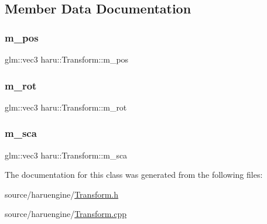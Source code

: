 \subsection{Member Data Documentation}
\mbox{\label{classharu_1_1_transform_a35eaba7475c13b6ad5925d112e4970ac}} 
\subsubsection{\texorpdfstring{m\+\_\+pos}{m\_pos}}
{\footnotesize\ttfamily glm\+::vec3 haru\+::\+Transform\+::m\+\_\+pos\hspace{0.3cm}{\ttfamily [private]}}

\mbox{\label{classharu_1_1_transform_af4ed94d05315ca5235e8a7ee7dd11990}} 
\subsubsection{\texorpdfstring{m\+\_\+rot}{m\_rot}}
{\footnotesize\ttfamily glm\+::vec3 haru\+::\+Transform\+::m\+\_\+rot\hspace{0.3cm}{\ttfamily [private]}}

\mbox{\label{classharu_1_1_transform_a1bba1e129d40a560ac0615b8e2de0d6e}} 
\subsubsection{\texorpdfstring{m\+\_\+sca}{m\_sca}}
{\footnotesize\ttfamily glm\+::vec3 haru\+::\+Transform\+::m\+\_\+sca\hspace{0.3cm}{\ttfamily [private]}}



The documentation for this class was generated from the following files\+:\begin{DoxyCompactItemize}
\item 
source/haruengine/\mbox{\hyperlink{_transform_8h}{Transform.\+h}}\item 
source/haruengine/\mbox{\hyperlink{_transform_8cpp}{Transform.\+cpp}}\end{DoxyCompactItemize}
